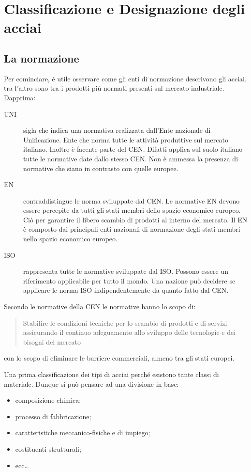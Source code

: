 \chapter{Classificazione e Designazione degli acciai}\label{chp:ClassAcc}
\section{La normazione}
Per cominciare, è utile osservare come gli enti di normazione descrivono gli acciai.
tra l'altro sono tra i prodotti più normati presenti sul mercato industriale.
Dapprima:
\begin{description}
\item[UNI] sigla che indica una normativa realizzata dall'Ente nazionale di Unificazione.
Ente che norma tutte le attività produttive sul mercato italiano. Inoltre è facente parte del \acs{CEN}. Difatti applica sul suolo italiano tutte le normative date dallo stesso \acs{CEN}.
Non è ammessa la presenza di normative che siano in contrasto con quelle europee.
\item[EN] contraddistingue le norma sviluppate dal \ac{CEN}.
Le normative EN devono essere percepite da tutti gli stati membri dello spazio economico europeo.
Ciò per garantire il libero scambio di prodotti al interno del mercato.
Il EN è composto dai principali enti nazionali di normazione degli stati membri nello spazio economico europeo.
\item[ISO] rappresenta tutte le normative sviluppate dal \ac{ISO}. Possono essere un riferimento applicabile per tutto il mondo. Una nazione può decidere se applicare le norma \acs{ISO} indipendentemente da quanto fatto dal \acs{CEN}.
\end{description} 

Secondo le normative della \acs{CEN} le normative hanno lo scopo di:
\begin{quote}
Stabilire le condizioni tecniche per lo scambio di prodotti e di servizi assicurando il continuo adeguamento allo sviluppo delle tecnologie e dei bisogni del mercato
\end{quote}
con lo scopo di eliminare le barriere commerciali, almeno tra gli stati europei.

Una prima classificazione dei tipi di acciai perché esistono tante classi di materiale.
Dunque si può pensare ad una divisione in base:
\begin{multicols}{2}
\begin{itemize}
\item composizione chimica;
\item processo di fabbricazione;
\item caratteristiche meccanico-fisiche e di impiego;
\columnbreak
\item costituenti strutturali;
\item ecc\dots
\end{itemize}
\end{multicols}

